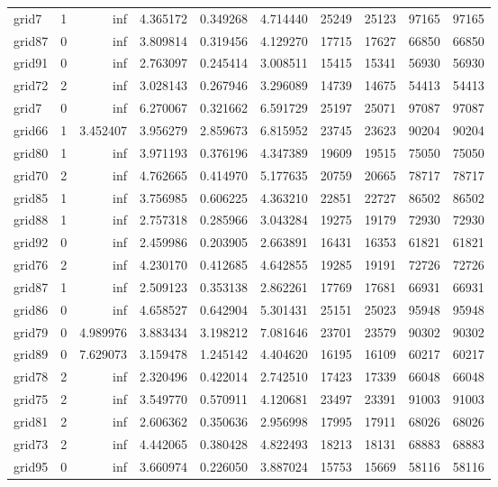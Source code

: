 \begin{longtable}{|l|r|r|r|r|r|r|r|r|r|}
grid7 & 1 & inf & 4.365172 & 0.349268 & 4.714440 & 25249 & 25123 & 97165 & 97165 \\
grid87 & 0 & inf & 3.809814 & 0.319456 & 4.129270 & 17715 & 17627 & 66850 & 66850 \\
grid91 & 0 & inf & 2.763097 & 0.245414 & 3.008511 & 15415 & 15341 & 56930 & 56930 \\
grid72 & 2 & inf & 3.028143 & 0.267946 & 3.296089 & 14739 & 14675 & 54413 & 54413 \\
grid7 & 0 & inf & 6.270067 & 0.321662 & 6.591729 & 25197 & 25071 & 97087 & 97087 \\
grid66 & 1 & 3.452407 & 3.956279 & 2.859673 & 6.815952 & 23745 & 23623 & 90204 & 90204 \\
grid80 & 1 & inf & 3.971193 & 0.376196 & 4.347389 & 19609 & 19515 & 75050 & 75050 \\
grid70 & 2 & inf & 4.762665 & 0.414970 & 5.177635 & 20759 & 20665 & 78717 & 78717 \\
grid85 & 1 & inf & 3.756985 & 0.606225 & 4.363210 & 22851 & 22727 & 86502 & 86502 \\
grid88 & 1 & inf & 2.757318 & 0.285966 & 3.043284 & 19275 & 19179 & 72930 & 72930 \\
grid92 & 0 & inf & 2.459986 & 0.203905 & 2.663891 & 16431 & 16353 & 61821 & 61821 \\
grid76 & 2 & inf & 4.230170 & 0.412685 & 4.642855 & 19285 & 19191 & 72726 & 72726 \\
grid87 & 1 & inf & 2.509123 & 0.353138 & 2.862261 & 17769 & 17681 & 66931 & 66931 \\
grid86 & 0 & inf & 4.658527 & 0.642904 & 5.301431 & 25151 & 25023 & 95948 & 95948 \\
grid79 & 0 & 4.989976 & 3.883434 & 3.198212 & 7.081646 & 23701 & 23579 & 90302 & 90302 \\
grid89 & 0 & 7.629073 & 3.159478 & 1.245142 & 4.404620 & 16195 & 16109 & 60217 & 60217 \\
grid78 & 2 & inf & 2.320496 & 0.422014 & 2.742510 & 17423 & 17339 & 66048 & 66048 \\
grid75 & 2 & inf & 3.549770 & 0.570911 & 4.120681 & 23497 & 23391 & 91003 & 91003 \\
grid81 & 2 & inf & 2.606362 & 0.350636 & 2.956998 & 17995 & 17911 & 68026 & 68026 \\
grid73 & 2 & inf & 4.442065 & 0.380428 & 4.822493 & 18213 & 18131 & 68883 & 68883 \\
grid95 & 0 & inf & 3.660974 & 0.226050 & 3.887024 & 15753 & 15669 & 58116 & 58116 \\

\end{longtable}
